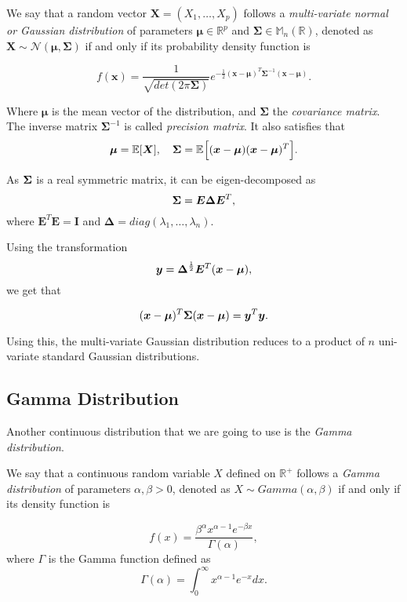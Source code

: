 \begin{definition}
We say that a random vector \(\bm{X} = (X_1,\dots,X_p)\) follows a \emph{multi-variate normal or Gaussian distribution} of parameters \(\bm{\mu} \in \mathbb{R}^p\) and \(\bm{\Sigma}
\in \mathbb{M}_n(\mathbb{R})\), denoted as \(\bm{X} \sim \mathcal{N}(\bm{\mu},
\bm{\Sigma})\) if and only if its probability density function is

\[
  f(\bm{x}) = \frac{1}{\sqrt{det(2\pi \bm{\Sigma})}}e^{-\frac{1}{2}(\bm{x} - \bm{\mu})^T\bm{\Sigma}^{-1}(\bm{x}-\bm{\mu})} .
\]

Where \(\bm{\mu}\) is the mean vector of the distribution, and \(\bm{\Sigma}\)
the \emph{covariance matrix}. The inverse matrix \(\bm{\Sigma}^{-1}\) is called \emph{precision matrix}.
It also satisfies that
\[
\bm{\mu} = \mathbb{E}[\bm{X}], \quad \bm{\Sigma} = \mathbb{E}_{}\Big[(\bm{x} - \bm{\mu})(\bm{x} - \bm{\mu})^T\Big].
\]

As \(\bm{\Sigma}\) is a real symmetric matrix, it can be eigen-decomposed as
\[
  \bm{\Sigma} = \bm{E}\bm{\Delta}\bm{E}^T,
\]
where \(\bm{E}^T\bm{E} = \bm{I}\) and \(\bm{\Delta} =
diag(\lambda_1,\dots,\lambda_n)\).

Using the transformation
\[
  \bm{y} = \bm{\Delta}^{\frac{1}{2}}\bm{E}^T(\bm{x} - \bm{\mu}),
\]
we get that

\[
  (\bm{x} - \bm{\mu})^T\bm{\Sigma}(\bm{x} - \bm{\mu}) = \bm{y}^T\bm{y}.
\]

Using this, the multi-variate Gaussian distribution reduces to a product of \(n\)
uni-variate standard Gaussian distributions.

\end{definition}

\subsection*{Gamma Distribution}

Another continuous distribution that we are going to use is the \emph{Gamma
  distribution}.

\begin{definition}

We say that a continuous random variable \(X\) defined on \(\mathbb{R}^{+}\)  follows a \emph{Gamma distribution} of parameters \(\alpha, \beta > 0\), denoted as \(X \sim Gamma(\alpha, \beta)\) if and only if its density function is

\[
  f(x) = \frac{\beta^{\alpha} x^{\alpha-1}e^{-\beta x}}{\Gamma(\alpha)},
\]
where \(\Gamma\) is the Gamma function defined as
\[
  \Gamma(\alpha) = \int_{0}^{\infty}x^{\alpha-1}e^{-x} dx.
\]
\end{definition}

